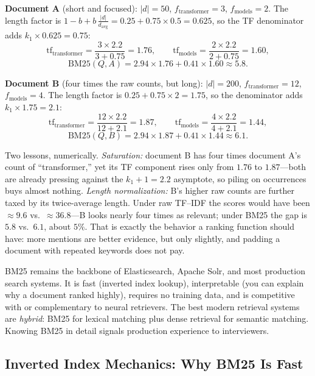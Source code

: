 \textbf{Document A} (short and focused): $|d| = 50$, $f_{\text{transformer}} = 3$,
$f_{\text{models}} = 2$. The length factor is
$1 - b + b\,\frac{|d|}{d_{\text{avg}}} = 0.25 + 0.75 \times 0.5 = 0.625$, so the TF
denominator adds $k_1 \times 0.625 = 0.75$:
\[
\text{tf}_{\text{transformer}} = \frac{3 \times 2.2}{3 + 0.75} = 1.76, \qquad
\text{tf}_{\text{models}} = \frac{2 \times 2.2}{2 + 0.75} = 1.60,
\]
\[
\text{BM25}(Q, A) = 2.94 \times 1.76 + 0.41 \times 1.60 \approx 5.8 .
\]

\textbf{Document B} (four times the raw counts, but long): $|d| = 200$,
$f_{\text{transformer}} = 12$, $f_{\text{models}} = 4$. The length factor is
$0.25 + 0.75 \times 2 = 1.75$, so the denominator adds $k_1 \times 1.75 = 2.1$:
\[
\text{tf}_{\text{transformer}} = \frac{12 \times 2.2}{12 + 2.1} = 1.87, \qquad
\text{tf}_{\text{models}} = \frac{4 \times 2.2}{4 + 2.1} = 1.44,
\]
\[
\text{BM25}(Q, B) = 2.94 \times 1.87 + 0.41 \times 1.44 \approx 6.1 .
\]

Two lessons, numerically. \emph{Saturation:} document B has four times document A's
count of ``transformer,'' yet its TF component rises only from $1.76$ to $1.87$---both
are already pressing against the $k_1 + 1 = 2.2$ asymptote, so piling on occurrences
buys almost nothing. \emph{Length normalization:} B's higher raw counts are further
taxed by its twice-average length. Under raw TF--IDF the scores would have been
$\approx 9.6$ vs.\ $\approx 36.8$---B looks nearly four times as relevant; under BM25
the gap is $5.8$ vs.\ $6.1$, about $5\%$. That is exactly the behavior a ranking
function should have: more mentions are better evidence, but only slightly, and
padding a document with repeated keywords does not pay.

\begin{keyinsight}
BM25 remains the backbone of Elasticsearch, Apache Solr, and most production search
systems. It is fast (inverted index lookup), interpretable (you can explain why a document
ranked highly), requires no training data, and is competitive with or complementary to
neural retrievers. The best modern retrieval systems are \emph{hybrid}: BM25 for lexical
matching plus dense retrieval for semantic matching. Knowing BM25 in detail signals
production experience to interviewers.
\end{keyinsight}

\subsection{Inverted Index Mechanics: Why BM25 Is Fast}
\label{sec:inverted_index}


